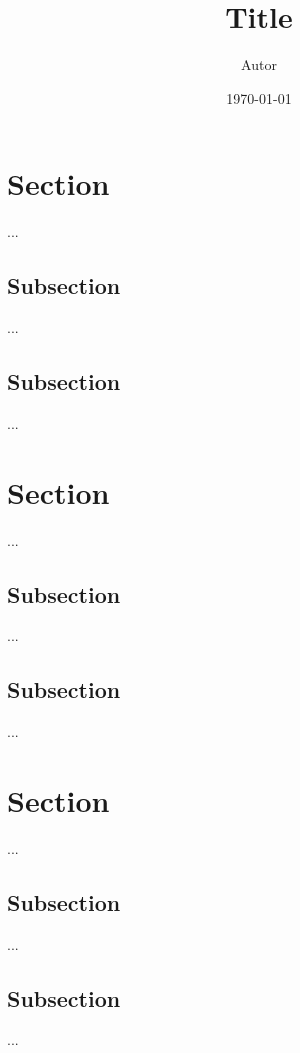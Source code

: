 \documentclass[11pt,a4paper]{jsarticle}
\title{Title}
\author{Autor}
\date{\today}
\begin{document}
\maketitle
%
%


\section{Section}
...

\subsection{Subsection}
...

\subsection{Subsection}
...

\section{Section}
...

\subsection{Subsection}
...

\subsection{Subsection}
...

\section{Section}
...

\subsection{Subsection}
...

\subsection{Subsection}
...

%
%
\end{document}
